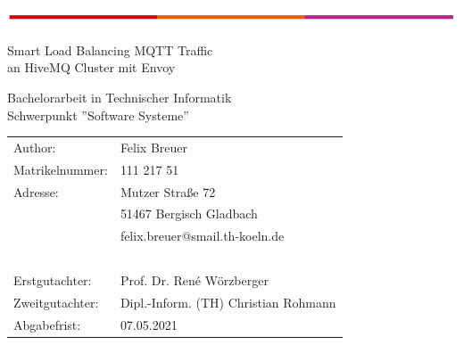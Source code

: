 \begin{titlepage}
\begin{flushleft}
	\vspace*{-1cm}
	\includegraphics[scale=1]{images/th-bar.png}\\
	\vspace*{1cm}
\end{flushleft}
\begin{center}
\begin{huge}
Smart Load Balancing MQTT Traffic\\
an HiveMQ Cluster mit Envoy\\
\end{huge}
\vspace{2cm}
Bachelorarbeit in Technischer Informatik\\
Schwerpunkt ''Software Systeme''
\end{center}
\vspace{4cm}
\noindent\begin{tabular}{p{5cm}l}
	Author: & Felix Breuer \\
	Matrikelnummer: &	111 217 51 \\
	Adresse: & Mutzer Stra{\ss}e 72 \\
	~ &	51467 Bergisch Gladbach \\
	~ &	felix.breuer@smail.th-koeln.de \\
	~ & ~ \\
	Erstgutachter: & Prof. Dr. René Wörzberger \\
	Zweitgutachter: & Dipl.-Inform. (TH) Christian Rohmann \\
	Abgabefrist: & 07.05.2021 \\
\end{tabular}
~\\
~\\
~\\
~\\
~\\
~\\
\end{titlepage}
\newpage
